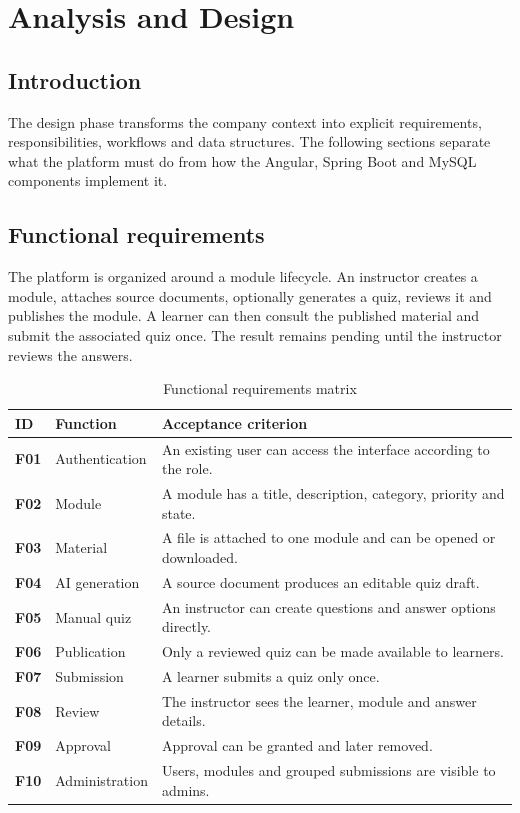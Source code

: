 ﻿\chapter{Analysis and Design}
\section*{Introduction}
The design phase transforms the company context into explicit requirements,
responsibilities, workflows and data structures. The following sections
separate what the platform must do from how the Angular, Spring Boot and
MySQL components implement it.

\section{Functional requirements}
The platform is organized around a module lifecycle. An instructor creates a
module, attaches source documents, optionally generates a quiz, reviews it and
publishes the module. A learner can then consult the published material and
submit the associated quiz once. The result remains pending until the
instructor reviews the answers.

\begin{table}[H]\centering
\caption{Functional requirements matrix}\label{tab:requirements}
\begin{tabularx}{\textwidth}{>{\bfseries}p{}p{}X}
ID & Function & Acceptance criterion\\\toprule
F01 & Authentication & An existing user can access the interface according to the role.\\
F02 & Module & A module has a title, description, category, priority and state.\\
F03 & Material & A file is attached to one module and can be opened or downloaded.\\
F04 & AI generation & A source document produces an editable quiz draft.\\
F05 & Manual quiz & An instructor can create questions and answer options directly.\\
F06 & Publication & Only a reviewed quiz can be made available to learners.\\
F07 & Submission & A learner submits a quiz only once.\\
F08 & Review & The instructor sees the learner, module and answer details.\\
F09 & Approval & Approval can be granted and later removed.\\
F10 & Administration & Users, modules and grouped submissions are visible to admins.\\
\bottomrule
\end{tabularx}
\end{table}

